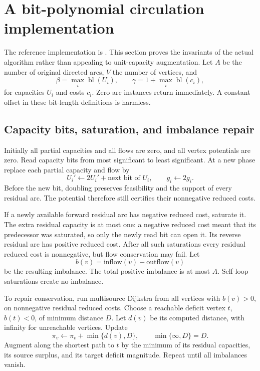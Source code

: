 \documentclass[11pt,letterpaper]{article}
\theoremstyle{definition}
\theoremstyle{remark}\newtheorem{remark}[theorem]{Remark}
\newcommand{\bl}{\operatorname{bl}}
\begin{document}
\section{A bit-polynomial circulation implementation}
\label{sec:flow}

The reference implementation is . This section
proves the invariants of the actual algorithm rather than appealing to
unit-capacity augmentation. Let $A$ be the number of original directed arcs,
$V$ the number of vertices, and
\[
 \beta=\max_i\bl(U_i),\qquad
 \gamma=1+\max_i\bl(c_i),
\]
for capacities $U_i$ and costs $c_i$. Zero-arc instances return immediately.
A constant offset in these bit-length definitions is harmless.

\subsection{Capacity bits, saturation, and imbalance repair}

Initially all partial capacities and all flows are zero, and all vertex
potentials are zero. Read capacity bits from most significant to least
significant. At a new phase replace each partial capacity and flow by
\[
 U_i'\leftarrow 2U_i'+\text{next bit of }U_i,
 \qquad g_i\leftarrow 2g_i.
\]
Before the new bit, doubling preserves feasibility and the support of every
residual arc. The potential therefore still certifies their nonnegative
reduced costs.

If a newly available forward residual arc has negative reduced cost, saturate
it. The extra residual capacity is at most one: a negative reduced cost meant
that its predecessor was saturated, so only the newly read bit can open it.
Its reverse residual arc has positive reduced cost. After all such saturations
every residual reduced cost is nonnegative, but flow conservation may fail.
Let
\[
 b(v)=\text{inflow}(v)-\text{outflow}(v)
\]
be the resulting imbalance. The total positive imbalance is at most $A$.
Self-loop saturations create no imbalance.

To repair conservation, run multisource Dijkstra from all vertices with
$b(v)>0$, on nonnegative residual reduced costs. Choose a reachable deficit
vertex $t$, $b(t)<0$, of minimum distance $D$. Let $d(v)$ be its computed
distance, with infinity for unreachable vertices. Update
\begin{equation}
 \pi_v\leftarrow\pi_v+\min\{d(v),D\},
 \qquad \min\{\infty,D\}=D.
 \label{eq:truncateddistance}
\end{equation}
Augment along the shortest path to $t$ by the minimum of its residual
capacities, its source surplus, and its target deficit magnitude. Repeat
until all imbalances vanish.
\end{document}
